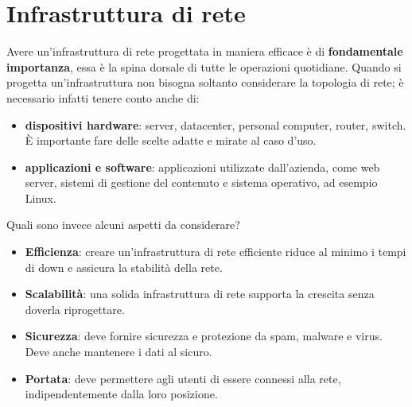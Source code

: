 \section{Infrastruttura di rete}
Avere un'infrastruttura di rete progettata in maniera efficace è di \textbf{fondamentale importanza}, essa è la spina dorsale di tutte le operazioni quotidiane. Quando si progetta un'infrastruttura non bisogna soltanto considerare la topologia di rete; è necessario infatti tenere conto anche di:
\begin{itemize}
    \item \textbf{dispositivi hardware}: server, datacenter, personal computer, router, switch. È importante fare delle scelte adatte e mirate al caso d'uso.
    \item \textbf{applicazioni e software}: applicazioni utilizzate dall'azienda, come web server, sistemi di gestione del contenuto e sistema operativo, ad esempio Linux. 
\end{itemize}


Quali sono invece alcuni aspetti da considerare? 
\begin{itemize}
    \item \textbf{Efficienza}: creare un'infrastruttura di rete efficiente riduce al minimo i tempi di down e assicura la stabilità della rete.
    \item \textbf{Scalabilità}: una solida infrastruttura di rete supporta la crescita senza doverla riprogettare.
    \item \textbf{Sicurezza}: deve fornire sicurezza e protezione da spam, malware e virus. Deve anche mantenere i dati al sicuro.
    \item \textbf{Portata}: deve permettere agli utenti di essere connessi alla rete, indipendentemente dalla loro posizione.
\end{itemize}


